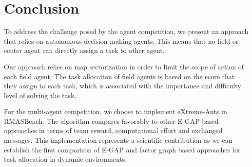 \section{Conclusion}

To address the challenge posed by the agent competition, we present an approach that relies on autonomous decision-making agents. This means that no field or center agent can directly assign a task to other agent. %

Our approach relies on map sectorization in order to limit the scope of action of each field agent. The task allocation of field agents is based on the score that they assign to each task, which is associated with the importance and difficulty level of solving the task. %

For the multi-agent competition, we choose to implement eXtreme-Ants in RMASBench. The algorithm compares favorably to other E-GAP based approaches in terms of team reward, computational effort and exchanged messages. This implementation represents a scientific contribution as we can establish the first comparison of E-GAP and factor graph based approaches for task allocation in dynamic environments.%

